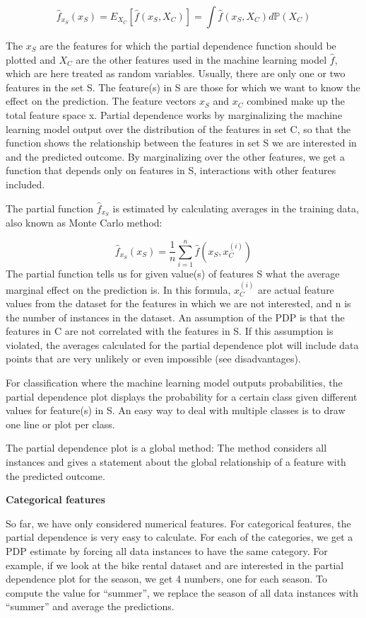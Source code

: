 \documentclass[12pt,]{krantz}
\begin{document}
\[\hat{f}_{x_S}(x_S)=E_{X_C}\left[\hat{f}(x_S,X_C)\right]=\int\hat{f}(x_S,X_C)d\mathbb{P}(X_C)\]

The \(x_S\) are the features for which the partial dependence function
should be plotted and \(X_C\) are the other features used in the machine
learning model \(\hat{f}\), which are here treated as random variables.
Usually, there are only one or two features in the set S. The feature(s)
in S are those for which we want to know the effect on the prediction.
The feature vectors \(x_S\) and \(x_C\) combined make up the total
feature space x. Partial dependence works by marginalizing the machine
learning model output over the distribution of the features in set C, so
that the function shows the relationship between the features in set S
we are interested in and the predicted outcome. By marginalizing over
the other features, we get a function that depends only on features in
S, interactions with other features included.

The partial function \(\hat{f}_{x_S}\) is estimated by calculating
averages in the training data, also known as Monte Carlo method:

\[\hat{f}_{x_S}(x_S)=\frac{1}{n}\sum_{i=1}^n\hat{f}(x_S,x^{(i)}_{C})\]
The partial function tells us for given value(s) of features S what the
average marginal effect on the prediction is. In this formula,
\(x^{(i)}_{C}\) are actual feature values from the dataset for the
features in which we are not interested, and n is the number of
instances in the dataset. An assumption of the PDP is that the features
in C are not correlated with the features in S. If this assumption is
violated, the averages calculated for the partial dependence plot will
include data points that are very unlikely or even impossible (see
disadvantages).

For classification where the machine learning model outputs
probabilities, the partial dependence plot displays the probability for
a certain class given different values for feature(s) in S. An easy way
to deal with multiple classes is to draw one line or plot per class.

The partial dependence plot is a global method: The method considers all
instances and gives a statement about the global relationship of a
feature with the predicted outcome.

\textbf{Categorical features}

So far, we have only considered numerical features. For categorical
features, the partial dependence is very easy to calculate. For each of
the categories, we get a PDP estimate by forcing all data instances to
have the same category. For example, if we look at the bike rental
dataset and are interested in the partial dependence plot for the
season, we get 4 numbers, one for each season. To compute the value for
``summer'', we replace the season of all data instances with ``summer''
and average the predictions.
\end{document}

